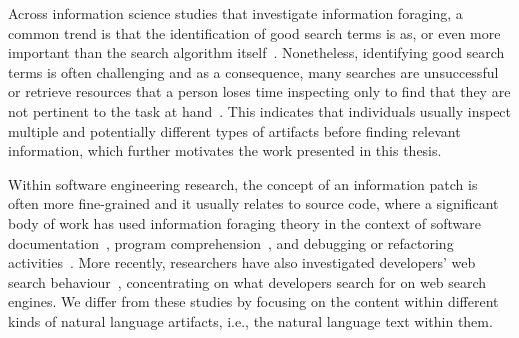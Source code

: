 









Across information science studies that investigate information foraging, 
a common trend is that the identification of good search terms is as, or even more
important than the search algorithm itself~\cite{Kevic2014}. 
Nonetheless, identifying good search terms is often challenging and 
as a consequence, many searches are unsuccessful or retrieve resources that 
a person loses time inspecting only to find that they are not pertinent to the task at hand~\cite{novotny2004don, Haiduc2013}.
This indicates that individuals usually inspect multiple and potentially different types of artifacts 
before finding relevant information, which further motivates the work presented in this thesis.




Within software engineering research, the concept of an information patch 
is often more fine-grained and it usually relates to source code, where a significant body of work has 
used information foraging theory in the context of software documentation~\cite{Forward2002, DeGraaf2014, Wildemuth2012},
program comprehension~\cite{piorkowski2013, Ko2006a}, and debugging or refactoring activities~\cite{fleming2013, lawrance2010}. 
More recently, researchers have also investigated developers' web search 
behaviour~\cite{Starke2009, Brandt2009a, Xia2017}, concentrating on what developers search for on web search engines. 
We differ from these studies by focusing 
on the content within different kinds of natural language artifacts, i.e., 
the natural language text within them.






